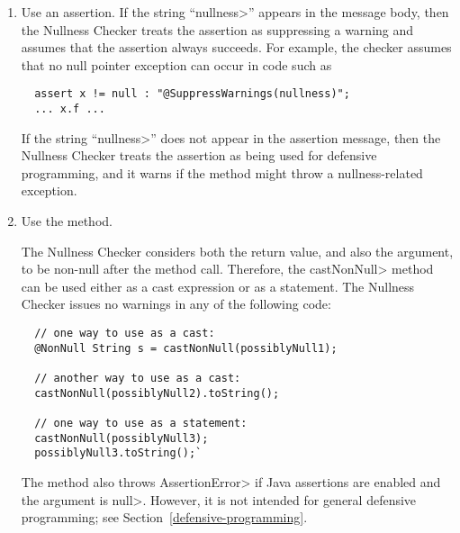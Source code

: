 \newcommand{\nullnessSuppressionString}{nullness}

\begin{enumerate}
\item
  Use an assertion.  If the string ``\<\nullnessSuppressionString>''
  appears in the message body, then the Nullness Checker treats the
  assertion as suppressing a warning and assumes that the assertion always
  succeeds.  For example, the checker assumes that no null pointer
  exception can occur in code such as
\begin{Verbatim}
  assert x != null : "@SuppressWarnings(nullness)";
  ... x.f ...
\end{Verbatim}

  If the string ``\<\nullnessSuppressionString>'' does not appear in the
  assertion message, then the Nullness Checker treats the assertion as being
  used for defensive programming, and it warns if the method might throw a
  nullness-related exception.


\item
  Use the  method.

The Nullness
 Checker considers both the return value, and also the argument, to
 be non-null after the method call.  Therefore, the
 \<castNonNull> method can be used either as a cast expression or
 as a statement.  The Nullness Checker issues no warnings in any of
the following code:

\begin{Verbatim}
  // one way to use as a cast:
  @NonNull String s = castNonNull(possiblyNull1);

  // another way to use as a cast:
  castNonNull(possiblyNull2).toString();

  // one way to use as a statement:
  castNonNull(possiblyNull3);
  possiblyNull3.toString();`
\end{Verbatim}

  The method also throws \<AssertionError> if Java assertions are enabled and
  the argument is \<null>.  However, it is not intended for general defensive
  programming; see Section~\ref{defensive-programming}.


\end{enumerate}
